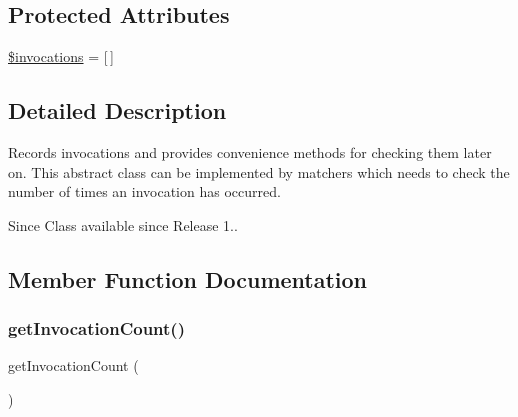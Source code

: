 \subsection*{Protected Attributes}
\begin{DoxyCompactItemize}
\item 
\mbox{\hyperlink{class_p_h_p_unit___framework___mock_object___matcher___invoked_recorder_ada793393eabb37d3176ee6d21e92e819}{\$invocations}} = \mbox{[}$\,$\mbox{]}
\end{DoxyCompactItemize}


\subsection{Detailed Description}
Records invocations and provides convenience methods for checking them later on. This abstract class can be implemented by matchers which needs to check the number of times an invocation has occurred.

\begin{DoxySince}{Since}
Class available since Release 1..  
\end{DoxySince}


\subsection{Member Function Documentation}
\mbox{\label{class_p_h_p_unit___framework___mock_object___matcher___invoked_recorder_a815caba4d48ea1a37f86fb79460e648f}} 
\subsubsection{\texorpdfstring{get\+Invocation\+Count()}{getInvocationCount()}}
{\footnotesize\ttfamily get\+Invocation\+Count (\begin{DoxyParamCaption}{ }\end{DoxyParamCaption})}

